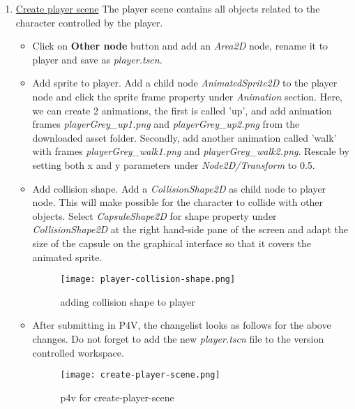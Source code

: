 \begin{enumerate}
\begin{itemize}
    \end{itemize}
    \item \href{https://docs.godotengine.org/en/stable/getting_started/first_2d_game/02.player_scene.html}{\color{blue}Create player scene} 
    The player scene contains all objects related to the character controlled by the player.
    \begin{itemize}
        \item Click on \textbf{Other node} button and add an \textit{Area2D} node, rename it to player and save as 
        \textit{player.tscn}.
        \item \label{animation} Add sprite to player. Add a child node \textit{AnimatedSprite2D} to the player node and click the sprite frame
        property under \textit{Animation} section. Here, we can create 2 animations, the first is called 'up', and add 
        animation frames \textit{playerGrey\_up1.png} and \textit{playerGrey\_up2.png} from the downloaded asset folder.
        Secondly, add another animation called 'walk' with frames 
        \textit{playerGrey\_walk1.png} and \textit{playerGrey\_walk2.png}. Rescale by setting both x and y parameters under 
        \textit{Node2D/Transform} to 0.5.
        \item Add collision shape. Add a \textit{CollisionShape2D} as child node to player node. This will make possible
        for the character to collide with other objects. Select \textit{CapsuleShape2D} for shape property under 
        \textit{CollisionShape2D} at the right hand-side pane of the screen and adapt the size of the capsule on the 
        graphical interface so that it covers the animated sprite.
        \begin{figure}[H]
            \centering
            \texttt{[image: player-collision-shape.png]}
            \caption{adding collision shape to player}
            \label{fig:player-collision-shape}
        \end{figure}
        \item After submitting in P4V, the changelist looks as follows for the above changes. Do not forget to add 
        the new \textit{player.tscn} file to the version controlled workspace.
        \begin{figure}[H]
            \centering
            \texttt{[image: create-player-scene.png]}
            \caption{p4v for create-player-scene}
            \label{fig:create-player-scene}
        \end{figure}
    \end{itemize}
\end{enumerate}